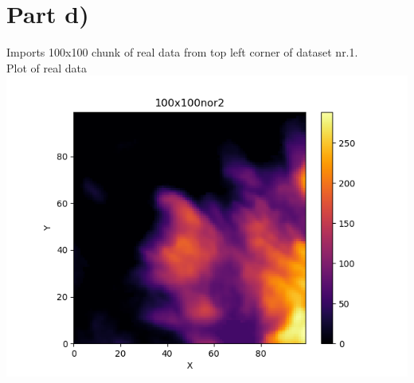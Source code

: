 \documentclass[a4paper,norsk]{article}
\begin{document}
\section*{Part d)}
Imports 100x100 chunk of real data from top left corner of dataset nr.1.
\\Plot of real data
\\ \includegraphics[scale=.7]{100x100nor2}
\clearpage
\end{document}
